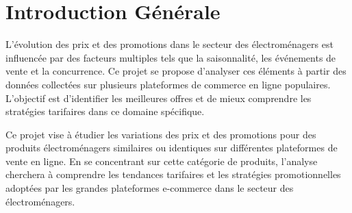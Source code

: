 \documentclass[a4paper, 12pt, oneside]{report}
\begin{document}
\begin{abstract}
Ce projet porte sur l'analyse des variations des prix et des promotions des produits électroménagers à travers plusieurs plateformes de commerce en ligne. L'objectif est de comparer les stratégies tarifaires et promotionnelles utilisées par les principales plateformes e-commerce dans le secteur de l'électroménager. En utilisant des techniques de \textit{web scraping}, les données ont été collectées sur des sites tels que BestBuy, LG, et Samsung. Ces informations ont été nettoyées, préparées et analysées pour identifier les tendances de prix, les périodes de promotions, ainsi que les effets de ces dernières sur les stratégies de prix. Les résultats obtenus sont présentés sous forme de graphiques permettant de visualiser les écarts de prix entre les plateformes, la fréquence des promotions, ainsi que l'évolution temporelle des prix. Cette analyse fournit des informations précieuses pour comprendre les pratiques tarifaires dans le secteur des produits électroménagers et pourrait aider les consommateurs à faire des choix plus éclairés lors de leurs achats en ligne.
\end{abstract}

\renewcommand*{\contentsname}{Table des matières}
\begin{doublespace}
\tableofcontents
\end{doublespace}
\cleardoublepage

{}
\renewcommand*{\listfigurename}{Liste des figures}
\listoffigures



\chapter{Introduction Générale}
L'évolution des prix et des promotions dans le secteur des électroménagers est influencée par des facteurs multiples tels que la saisonnalité, les événements de vente et la concurrence. Ce projet se propose d’analyser ces éléments à partir des données collectées sur plusieurs plateformes de commerce en ligne populaires. L'objectif est d’identifier les meilleures offres et de mieux comprendre les stratégies tarifaires dans ce domaine spécifique.

\bigskip

Ce projet vise à étudier les variations des prix et des promotions pour des produits électroménagers similaires ou identiques sur différentes plateformes de vente en ligne. En se concentrant sur cette catégorie de produits, l'analyse cherchera à comprendre les tendances tarifaires et les stratégies promotionnelles adoptées par les grandes plateformes e-commerce dans le secteur des électroménagers.
\end{document}

